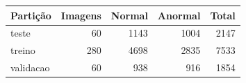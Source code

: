 \begin{tabular}{lrrrr}
\toprule
Partição & Imagens & Normal & Anormal & Total \\
\midrule
teste & 60 & 1143 & 1004 & 2147 \\
treino & 280 & 4698 & 2835 & 7533 \\
validacao & 60 & 938 & 916 & 1854 \\
\bottomrule
\end{tabular}
